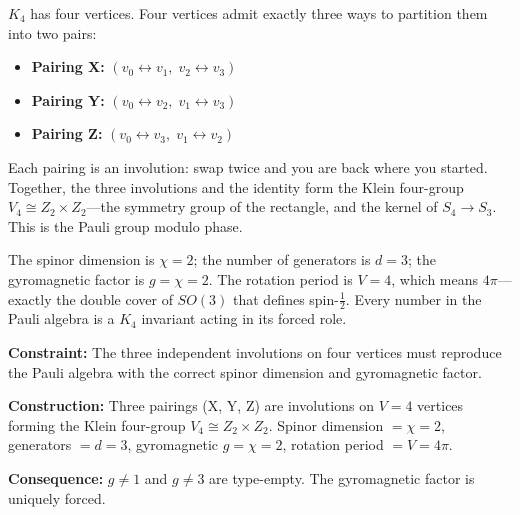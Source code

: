 \documentclass[11pt,a4paper]{book}
\def\mathbb#1{#1}%
\newcommand{\VoidRef}[2]{\textit{#2} (in \textit{Void})}
\begin{document}
$K_4$ has four vertices. Four vertices admit exactly three ways to partition them into two pairs:
\begin{itemize}
  \item \textbf{Pairing X:} $(v_0 \leftrightarrow v_1,\; v_2 \leftrightarrow v_3)$
  \item \textbf{Pairing Y:} $(v_0 \leftrightarrow v_2,\; v_1 \leftrightarrow v_3)$
  \item \textbf{Pairing Z:} $(v_0 \leftrightarrow v_3,\; v_1 \leftrightarrow v_2)$
\end{itemize}

Each pairing is an involution: swap twice and you are back where you started. Together, the three involutions and the identity form the Klein four-group $V_4 \cong \mathbb{Z}_2 \times \mathbb{Z}_2$---the symmetry group of the rectangle, and the kernel of $S_4 \to S_3$. This is the Pauli group modulo phase.

The spinor dimension is $\chi = 2$; the number of generators is $d = 3$; the gyromagnetic factor is $g = \chi = 2$. The rotation period is $V = 4$, which means $4\pi$---exactly the double cover of $SO(3)$ that defines spin-$\frac{1}{2}$. Every number in the Pauli algebra is a $K_4$ invariant acting in its forced role.


\textbf{Constraint:} The three independent involutions on four vertices must reproduce the Pauli algebra with the correct spinor dimension and gyromagnetic factor.

\textbf{Construction:} Three pairings (X, Y, Z) are involutions on $V = 4$ vertices forming the Klein four-group $V_4 \cong \mathbb{Z}_2 \times \mathbb{Z}_2$. Spinor dimension $= \chi = 2$, generators $= d = 3$, gyromagnetic $g = \chi = 2$, rotation period $= V = 4\pi$.

\textbf{Consequence:} $g \neq 1$ and $g \neq 3$ are type-empty. The gyromagnetic factor is uniquely forced.
\end{document}

